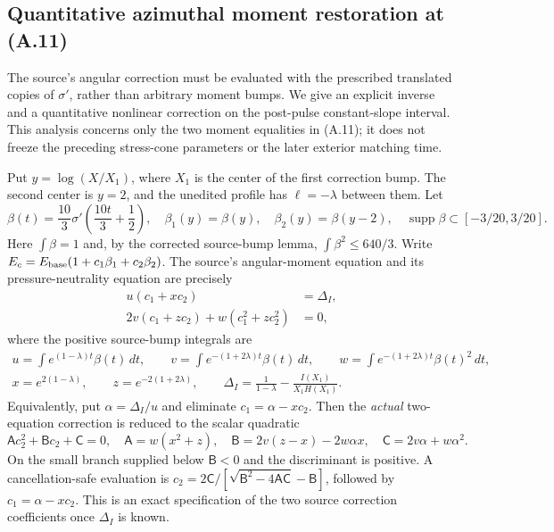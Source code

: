 \subsection*{Quantitative azimuthal moment restoration at (A.11)}
\label{subsec:exact-A11}
The source's angular correction must be evaluated with the prescribed
translated copies of $\sigma'$, rather than arbitrary moment bumps.
We give an explicit inverse and a quantitative nonlinear correction
on the post-pulse constant-slope interval. This analysis concerns
only the two moment equalities in (A.11); it does not freeze the
preceding stress-cone parameters or the later exterior matching time.

Put $y=\log(X/X_1)$, where $X_1$ is the center of the first
correction bump. The second center is $y=2$, and the unedited
profile has $\ell=-\lambda$ between them. Let
\[
 \beta(t)=\frac{10}{3}\sigma'\!\left(\frac{10t}{3}+\frac12\right),
 \quad \beta_1(y)=\beta(y),\quad\beta_2(y)=\beta(y-2),
 \quad \operatorname{supp}\beta\subset[-3/20,3/20].
\]
Here $\int\beta=1$ and, by the corrected source-bump lemma,
$\int\beta^2\le640/3$. Write
$E_c=E_{\rm base}(1+c_1\beta_1+c_2\beta_2)$.
The source's angular-moment equation and its pressure-neutrality
equation are precisely
\begin{equation}\label{eq:A11-two-exact}
 \begin{split}
 u(c_1+xc_2)&=\Delta_I,\\
 2v(c_1+zc_2)+w(c_1^2+zc_2^2)&=0,
 \end{split}
\end{equation}
where the positive source-bump integrals are
\begin{equation}\label{eq:A11-weights}
\begin{gathered}
 u=\int e^{(1-\lambda)t}\beta(t)\,dt,\qquad
 v=\int e^{-(1+2\lambda)t}\beta(t)\,dt,\qquad
 w=\int e^{-(1+2\lambda)t}\beta(t)^2\,dt,\\
 x=e^{2(1-\lambda)},\qquad z=e^{-2(1+2\lambda)},\qquad
 \Delta_I=\frac1{1-\lambda}-\frac{I(X_1)}{X_1H(X_1)}.
\end{gathered}
\end{equation}
Equivalently, put $\alpha=\Delta_I/u$ and eliminate
$c_1=\alpha-xc_2$. Then the \emph{actual} two-equation
correction is reduced to the scalar quadratic
\[
 \mathsf A c_2^2+\mathsf Bc_2+\mathsf C=0,\quad
 \mathsf A=w(x^2+z),\quad
 \mathsf B=2v(z-x)-2w\alpha x,\quad
 \mathsf C=2v\alpha+w\alpha^2.
\]
On the small branch supplied below $\mathsf B<0$ and the
discriminant is positive. A cancellation-safe evaluation is
$c_2=2\mathsf C/[\sqrt{\mathsf B^2-4\mathsf A\mathsf C}-\mathsf B]$,
followed by $c_1=\alpha-xc_2$. This is an exact specification
of the two source correction coefficients once $\Delta_I$ is known.


